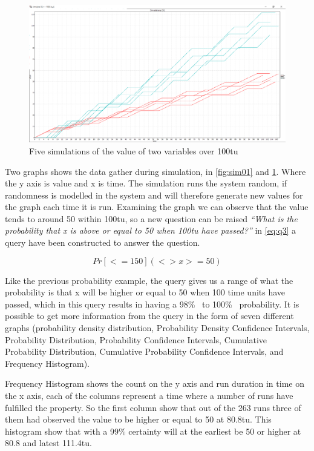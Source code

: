 \begin{figure}[!h]
	\includegraphics[width=\textwidth]{graphics/showcase02.png}
	\caption{Five simulations of the value of two variables  over 100\gls{tu}}
	\label{fig:sim02}
\end{figure}

Two graphs shows the data gather during simulation, in \cref{fig:sim01} and \cref{fig:sim02}. Where the y axis is value and x is time. The simulation runs the system random, if randomness is modelled in the system and will therefore generate new values for the graph each time it is run. Examining the graph we can observe that the value  tends to around 50 within 100\gls{tu}, so a new question can be raised \textit{``What is the probability that x is above or equal to 50 when 100\gls{tu} have passed?''} in \cref{eq:q3} a query have been constructed to answer the question.

\begin{equation}\label{eq:q3}
Pr[<=150](<> x >= 50)
\end{equation}

Like the previous probability example, the query gives us a range of what the probability is that x will be higher or equal to 50 when 100 time units have passed, which in this query results in having a 98\%~ to 100\%~ probability. It is possible to get more information from the query in the form of seven different graphs (probability density distribution, Probability Density Confidence Intervals, Probability Distribution, Probability Confidence Intervals, Cumulative Probability Distribution, Cumulative Probability Confidence Intervals, and Frequency Histogram). 

Frequency Histogram shows the count on the y axis and run duration in time on the x axis, each of the columns represent a time where a number of runs have fulfilled the property. So the first column show that out of the 263 runs three of them had observed the value  to be higher or equal to 50 at 80.8\gls{tu}. This histogram show that with a 99\% certainty  will at the earliest be 50 or higher at 80.8 and latest 111.4\gls{tu}.

